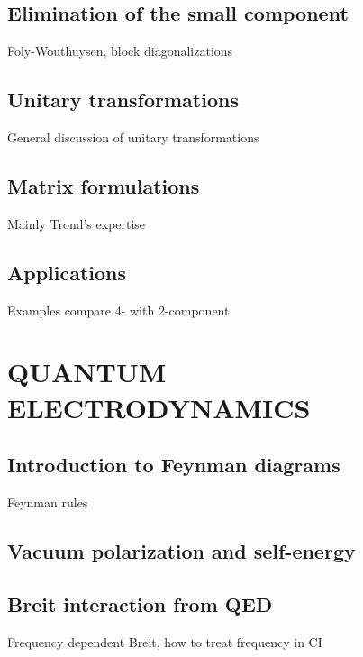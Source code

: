 \documentclass[12pt]{article}
\begin{document}
\subsection{\sffamily Elimination of the small component}
Foly-Wouthuysen, block diagonalizations

\subsection{\sffamily Unitary transformations}
General discussion of unitary transformations

\subsection{\sffamily Matrix formulations}
Mainly Trond's expertise

\subsection{\sffamily Applications}
Examples compare 4- with 2-component

\section{\label{QED} \sffamily \Large QUANTUM ELECTRODYNAMICS}

\subsection{\sffamily Introduction to Feynman diagrams}
Feynman rules




\subsection{\sffamily Vacuum polarization and self-energy}


\subsection{\sffamily Breit interaction from QED}
Frequency dependent Breit, how to treat frequency in CI
\end{document}

